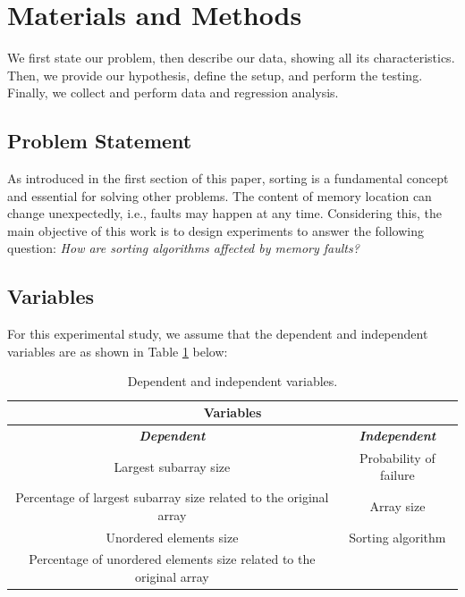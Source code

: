 \section{Materials and Methods}

We first state our problem, then describe our data, showing all its characteristics. Then, we provide our hypothesis, define the setup, and perform the testing. Finally, we collect and perform data and regression analysis.

\subsection{Problem Statement}

As introduced in the first section of this paper, sorting is a fundamental concept and essential for solving other problems. The content of memory location can change unexpectedly, i.e., faults may happen at any time. Considering this, the main objective of this work is to design experiments to answer the following question: \textit{How are sorting algorithms affected by memory faults?}

\subsection{Variables}

For this experimental study, we assume that the dependent and independent variables are as shown in Table \ref{table-variables} below:

\begin{table}[H]
    \caption{Dependent and independent variables.}
    \begin{center}
    \begin{tabular}{|c|c|}
    \hline
    \multicolumn{2}{|c|}{\textbf{Variables}}\\
    \hline
    \textbf{\textit{Dependent}} & \textbf{\textit{Independent}} \\
    \hline
    Largest subarray size & Probability of failure \\
    Percentage of largest subarray size related to the original array & Array size \\
    Unordered elements size & Sorting algorithm \\
    Percentage of unordered elements size related to the original array & \\
    \hline
    \end{tabular}
    \label{table-variables}
    \end{center}
\end{table}

